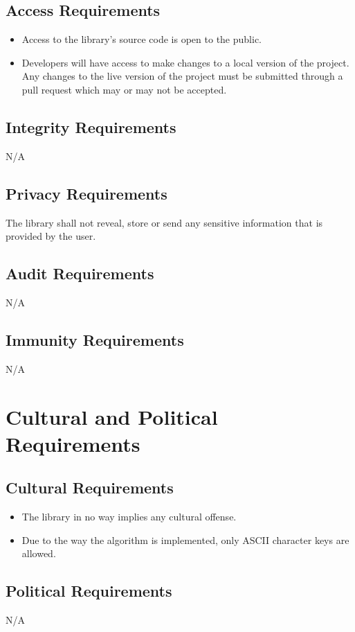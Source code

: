 \documentclass[12pt]{article}
\begin{document}
\subsection {Access Requirements}
\begin{itemize}
	\item Access to the library’s source code is open to the public.
	\item Developers will have access to make changes to a local version of the project. Any changes to the live version of the project must be submitted through a pull request which may or may not be accepted.
\end{itemize}

\subsection {Integrity Requirements}
N/A

\subsection {Privacy Requirements}
The library shall not reveal, store or send any sensitive information that is provided by the user. 

\subsection {Audit Requirements}
N/A

\subsection {Immunity Requirements}
N/A

\section {Cultural and Political Requirements}

\subsection {Cultural Requirements}
\begin{itemize}
	\item The library in no way implies any cultural offense.
	\item Due to the way the algorithm is implemented, only ASCII character keys are allowed.
	\end{itemize}

\subsection {Political Requirements}
N/A
\end{document}
